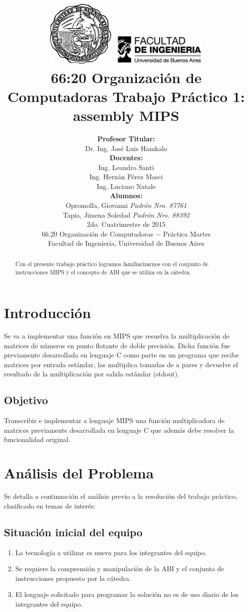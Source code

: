 \documentclass[a4paper,10pt]{article}
\title{
\includegraphics[width=0.25\textwidth]{content/escudodelauba2uj.jpg}
\includegraphics[width=0.35\textwidth]{content/logofiubabajatm9.jpg}\\[2.5ex] 
\textbf{66:20 Organizaci\'on de Computadoras  
    Trabajo Pr\'actico 1: assembly MIPS
}
}
\author{
	\textbf{Profesor Titular:} \\ 
	Dr. Ing. Jos\'e Luis Hamkalo  \\[2.5ex] 
	\textbf{Docentes:} \\
	Ing. Leandro Santi  \\
	Ing. Hern\'an P\'erez Masci\\
    Ing. Luciano Natale\\[2.5ex]
	\textbf{Alumnos:}								\\ 
    Opromolla, Giovanni \textit{Padr\'on Nro. 87761}				\\
    Tapia, Jimena Soledad \textit{Padr\'on Nro. 88392}				\\[2.5ex]
	\normalsize{2do. Cuatrimestre de 2015}									\\
	\normalsize{66.20 Organizaci\'on de Computadoras  $-$ Pr\'actica Martes}	\\
	\normalsize{Facultad de Ingenier\'ia, Universidad de Buenos Aires}		\\   
}
\date{}
\begin{document}
	\maketitle

\thispagestyle{empty}   %

\begin{abstract}
Con el presente trabajo pr\'actico logramos familiarizarnos con el conjunto de instrucciones MIPS y el concepto de ABI que se utiliza en la c\'atedra.

\end{abstract}

\newpage

%
\renewcommand{\contentsname}{Indice}
\tableofcontents
{}

\newpage

\section{Introducci\'on}
Se va a implementar una funci\'on en MIPS que resuelva la multiplicaci\'on de matrices de n\'umeros en punto flotante de doble precisi\'on. Dicha funci\'on fue previamente desarrollada en lenguaje C como parte en un programa que recibe matrices por entrada est\'andar, las multiplica tomadas de a pares y devuelve el resultado de la multiplicaci\'on por salida est\'andar (stdout).

\subsection{Objetivo}
Transcribir e implementar a lenguaje MIPS una funci\'on multiplicadora de matrices previamente desarrollada en lenguaje C que adem\'as debe resolver la funcionalidad original.

\newpage

\section{An\'alisis del Problema}
Se detalla a continuaci\'on el an\'alisis previo a la resoluci\'on del trabajo pr\'actico, clasificado en temas de inter\'es:

\subsection{Situaci\'on inicial del equipo}
\begin{enumerate}
\item La tecnolog\'ia a utilizar es nueva para los integrantes del equipo.
\item Se requiere la comprensi\'on y manipulaci\'on de la ABI y el conjunto de instrucciones propuesto por la c\'atedra.
\item El lenguaje solicitado para programar la soluci\'on no es de uso diario de los integrantes del equipo.
\end{enumerate}
\end{document}
